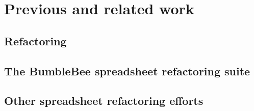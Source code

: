 \documentclass[12pt,a4paper,onecolumn,oneside,parskip]{memoir}
\begin{document}


\cleardoublepage

\tableofcontents*

\clearpage





\chapter{Previous and related work}
\label{chapter:previouswork}

\section{Refactoring}

\section{The BumbleBee spreadsheet refactoring suite}

\section{Other spreadsheet refactoring efforts}


\end{document}
